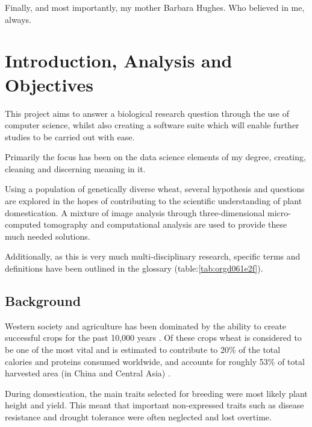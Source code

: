 \documentclass[11pt]{report}
\begin{document}
\vspace{1cm}

Finally, and most importantly, my mother Barbara Hughes. Who believed in me, always.



  \clearpage
  \tableofcontents
  \clearpage
  \listoftables
  \clearpage
  \listoffigures
  \clearpage
  \listofmyequations
  \clearpage
  \listoflistings
  \clearpage

\chapter{Introduction, Analysis and Objectives}
\label{sec:org5ea2c55}

This project aims to answer a biological research question through the use of computer science, whilst also creating a software suite which will enable further studies to be carried out with ease.

Primarily the focus has been on the data science elements of my degree, creating, cleaning and discerning meaning in it.

Using a population of genetically diverse wheat, several hypothesis and questions are explored in the hopes of contributing to the scientific understanding of plant domestication. A mixture of image analysis through three-dimensional micro-computed tomography and computational analysis are used to provide these much needed solutions.


Additionally, as this is very much multi-disciplinary research, specific terms and definitions have been outlined in the glossary (table:\ref{tab:orgd061e2f}).

\section{Background}
\label{sec:org0e36cdd}

Western society and agriculture has been dominated by the ability to create successful crops for the past 10,000 years \cite{Ozkan2002}. Of these crops wheat is considered to be one of the most vital and is estimated to contribute to 20\% of the total calories and proteins consumed worldwide, and accounts for roughly 53\% of total harvested area (in China and Central Asia) \cite{Shiferaw2013}.

During domestication, the main traits selected for breeding were most likely plant height and yield. This meant that important non-expressed traits such as disease resistance and drought tolerance were often neglected and lost overtime.
\end{document}

